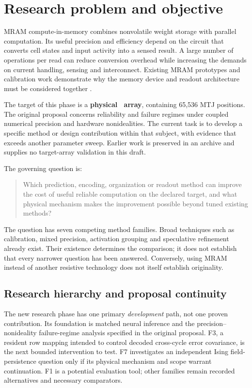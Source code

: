 \section{Research problem and objective}

MRAM compute-in-memory combines nonvolatile weight storage with parallel computation.
Its useful precision and efficiency depend on the circuit that converts cell states and
input activity into a sensed result. A large number of operations per read can reduce
conversion overhead while increasing the demands on current handling, sensing and
interconnect. Existing MRAM prototypes and calibration work demonstrate why the memory
device and readout architecture must be considered together \cite{S08,S23,S24}.

The target of this phase is a \textbf{physical \target\ array}, containing 65,536 MTJ
positions. The original proposal concerns reliability and failure regimes under coupled
numerical precision and hardware nonidealities. The current task is to develop a specific
method or design contribution within that subject, with evidence that exceeds another
parameter sweep. Earlier work is preserved in an archive and supplies no target-array
validation in this draft.

The governing question is:
\begin{quote}
Which prediction, encoding, organization or readout method can improve the cost of useful
reliable computation on the declared target, and what physical mechanism makes the
improvement possible beyond tuned existing methods?
\end{quote}

The question has seven competing method families. Broad techniques such as calibration,
mixed precision, activation grouping and speculative refinement already exist. Their
existence determines the comparison; it does not establish that every narrower question
has been answered. Conversely, using MRAM instead of another resistive technology does
not itself establish originality.

\subsection{Research hierarchy and proposal continuity}

The new research phase has one primary \emph{development} path, not one proven contribution.
Its foundation is matched neural inference and the precision--nonideality failure-regime
analysis specified in the original proposal. F3, a resident row mapping intended to
control decoded cross-cycle error covariance, is the next bounded intervention to test.
F7 investigates an independent Ising field-persistence question only if its physical
mechanism and scope warrant continuation. F1 is a potential evaluation tool; other
families remain recorded alternatives and necessary comparators.

